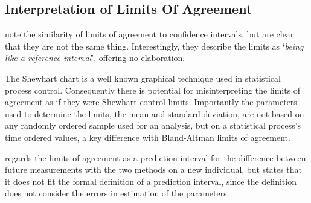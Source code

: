 \documentclass[12pt, a4paper]{report}
\theoremstyle{plain}
\theoremstyle{definition}
\theoremstyle{remark}
\begin{document}
\subsection{Interpretation of Limits Of Agreement}

%


\citet{BA99} note the similarity of limits of agreement to
confidence intervals, but are clear that they are not the same thing. Interestingly, they describe the limits as `\textit{being like a reference interval}', offering no elaboration.

The Shewhart chart is a well known graphical
technique used in statistical process control. Consequently
there is potential for misinterpreting the limits of agreement as
if they were Shewhart control limits. Importantly the
parameters used to determine the limits, the mean and standard
deviation, are not based on any randomly ordered sample used for an analysis, but on a statistical process's time ordered values, a key difference with Bland-Altman limits of agreement.


\citet{BXC2008} regards the limits of agreement as a prediction interval for the difference between future measurements with the two methods on a new individual, but states that it does not fit the formal definition of a prediction interval, since the
definition does not consider the errors in estimation of the parameters. 
\end{document}
